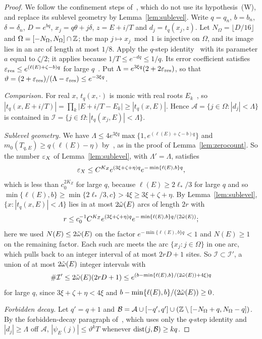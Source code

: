 \begin{proof}
We follow the confinement steps of~\cite[proof of Theorem~5.15]{DMuniv}, which do not use its hypothesis~(W), and replace its sublevel geometry by Lemma~\ref{lem:sublevel}. Write $q=q_n$, $b=b_n$, $\delta=\delta_n$, $D=e^{bq}$, $x_j=q\theta+j\delta$, $z=E+i/T$ and $d_j=t_q(x_j,z)$. Let $N_\Omega=\lfloor D/16\rfloor$ and $\Omega=[-N_\Omega,N_\Omega]\cap\mathbb Z$; the map $j\mapsto x_j\bmod1$ is injective on $\Omega$, and its image lies in an arc of length at most $1/8$. Apply the $q$-step identity~\cite[Lemma~5.7]{DMuniv} with its parameter $a$ equal to $\zeta/2$; it applies because $1/T\le e^{-dq}\le1/q$. Its error coefficient satisfies $\varepsilon_{\mathrm{res}}\le e^{(\ell(E)+\zeta-b)q}$ for large $q$~\cite[(E2) in the proof of Theorem~5.15]{DMuniv}. Put $\Lambda=e^{3\xi q}(2+2\varepsilon_{\mathrm{res}})$, so that $\vartheta=(2+\varepsilon_{\mathrm{res}})/(\Lambda-\varepsilon_{\mathrm{res}})\le e^{-3\xi q}$.

\emph{Comparison.} For real $x$, $t_q(x,\cdot)$ is monic with real roots $E_k$~\cite[Lemma~5.3]{DMuniv}, so $|t_q(x,E+i/T)|=\prod_k|E+i/T-E_k|\ge|t_q(x,E)|$. Hence $\mathcal A=\{j\in\Omega:|d_j|<\Lambda\}$ is contained in $\mathcal I=\{j\in\Omega:|t_q(x_j,E)|<\Lambda\}$.

\emph{Sublevel geometry.} We have $\Lambda\le4e^{3\xi q}\max\{1,e^{(\ell(E)+\zeta-b)q}\}$ and $m_0(T_{q,E})\ge q(\ell(E)-\eta)$ by~\cite[Lemma~7.6]{DMuniv}, as in the proof of Lemma~\ref{lem:zerocount}. So the number $\varepsilon_X$ of Lemma~\ref{lem:sublevel}, with $\Lambda'=\Lambda$, satisfies
\[
\varepsilon_X\le C^{K_Z}e^{(3\xi+\zeta+\eta)q}e^{-\min\{\ell(E),b\}q},
\]
which is less than $c_0^{2K_Z}$ for large $q$, because $\ell(E)\ge2\ell_*/3$ for large $q$ and so $\min\{\ell(E),b\}\ge\min\{2\ell_*/3,c\}>4\xi\ge3\xi+\zeta+\eta$. By Lemma~\ref{lem:sublevel}, $\{x:|t_q(x,E)|<\Lambda\}$ lies in at most $2\tilde\omega(E)$ arcs of length $2r$ with
\[
r\le c_0^{-1}C^{K_Z}e^{(3\xi+\zeta+\eta)q}e^{-\min\{\ell(E),b\}q/(2\tilde\omega(E))};
\]
here we used $N(E)\le2\tilde\omega(E)$ on the factor $e^{-\min\{\ell(E),b\}q}<1$ and $N(E)\ge1$ on the remaining factor. Each such arc meets the arc $\{x_j:j\in\Omega\}$ in one arc, which pulls back to an integer interval of at most $2rD+1$ sites. So $\mathcal I\subset\mathcal I'$, a union of at most $2\tilde\omega(E)$ integer intervals with
\[
\#\mathcal I'\le2\tilde\omega(E)(2rD+1)\le e^{(b-\min\{\ell(E),b\}/(2\tilde\omega(E))+4\xi)q}
\]
for large $q$, since $3\xi+\zeta+\eta<4\xi$ and $b-\min\{\ell(E),b\}/(2\tilde\omega(E))\ge0$.

\emph{Forbidden decay.} Let $q'=q+1$ and $\mathcal B=\mathcal A\cup[-q',q']\cup(\mathbb Z\setminus[-N_\Omega+q,N_\Omega-q])$. By the forbidden-decay paragraph of~\cite[proof of Theorem~5.15]{DMuniv}, which uses only the $q$-step identity and $|d_j|\ge\Lambda$ off $\mathcal A$, $|\psi_E(j)|\le\vartheta^kT$ whenever $\operatorname{dist}(j,\mathcal B)\ge kq$.


\end{proof}
